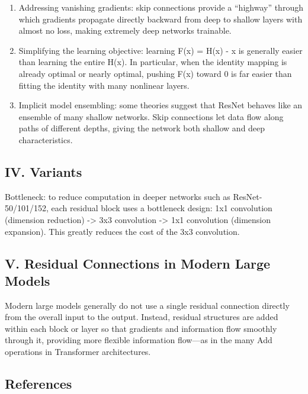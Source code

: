 \begin{enumerate}
\def\labelenumi{\arabic{enumi}.}
\item
  Addressing vanishing gradients: skip connections provide a ``highway'' through which gradients propagate directly backward from deep to shallow layers with almost no loss, making extremely deep networks trainable.
\item
  Simplifying the learning objective: learning F(x) = H(x) - x is generally easier than learning the entire H(x). In particular, when the identity mapping is already optimal or nearly optimal, pushing F(x) toward 0 is far easier than fitting the identity with many nonlinear layers.
\item
  Implicit model ensembling: some theories suggest that ResNet behaves like an ensemble of many shallow networks. Skip connections let data flow along paths of different depths, giving the network both shallow and deep characteristics.
\end{enumerate}

\hypertarget{iv.-variants}{%
\subsection{IV. Variants}\label{iv.-variants}}

Bottleneck: to reduce computation in deeper networks such as ResNet-50/101/152, each residual block uses a bottleneck design: 1x1 convolution (dimension reduction) -\textgreater{} 3x3 convolution -\textgreater{} 1x1 convolution (dimension expansion). This greatly reduces the cost of the 3x3 convolution.

\hypertarget{v.-residual-connections-in-modern-large-models}{%
\subsection{V. Residual Connections in Modern Large Models}\label{v.-residual-connections-in-modern-large-models}}

Modern large models generally do not use a single residual connection directly from the overall input to the output. Instead, residual structures are added within each block or layer so that gradients and information flow smoothly through it, providing more flexible information flow---as in the many Add operations in Transformer architectures.

\FloatBarrier
{}
\hypertarget{references-14}{%
\subsection{References}\label{references-14}}

